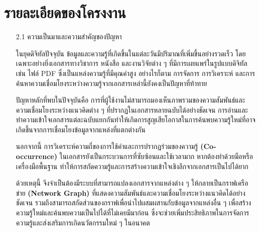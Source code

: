 \documentclass[12pt,a4paper]{article}
\newcommand{\textlight}[1]{{\thailightfont #1}}
\begin{document}
\section{รายละเอียดของโครงงาน}
\begin{enumerate}[leftmargin=2cm]
\small
    \item[2.1] ความเป็นมาและความสำคัญของปัญหา
    \vspace{0.35cm}
    \\
    \textlight{
        \hspace{1cm}ในยุคดิจิทัลปัจจุบัน ข้อมูลและความรู้ที่เกิดขึ้นในแต่ละวันมีปริมาณที่เพิ่มขึ้นอย่างรวดเร็ว โดยเฉพาะอย่างยิ่งเอกสารทางวิชาการ หนังสือ และงานวิจัยต่าง ๆ ที่มีการเผยแพร่ในรูปแบบดิจิทัล เช่น ไฟล์ PDF ซึ่งเป็นแหล่งความรู้ที่มีคุณค่าสูง อย่างไรก็ตาม การจัดการ การวิเคราะห์ และการค้นหาความเชื่อมโยงระหว่างความรู้จากเอกสารเหล่านี้ยังคงเป็นปัญหาที่ท้าทาย

        \hspace{1cm}ปัญหาหลักที่พบในปัจจุบันคือ การที่ผู้ใช้งานไม่สามารถมองเห็นภาพรวมของความสัมพันธ์และความเชื่อมโยงระหว่างแนวคิดต่าง ๆ ที่ปรากฏในเอกสารหลายฉบับได้อย่างชัดเจน การอ่านและทำความเข้าใจเอกสารแต่ละฉบับแยกกันทำให้เกิดการสูญเสียโอกาสในการค้นพบความรู้ใหม่ที่อาจเกิดขึ้นจากการเชื่อมโยงข้อมูลจากแหล่งที่แตกต่างกัน

        \hspace{1cm}นอกจากนี้ การวิเคราะห์ความถี่ของการใช้คำและการปรากฏร่วมของความรู้ \textbf{(Co-occurrence)} ในเอกสารยังเป็นกระบวนการที่ซับซ้อนและใช้เวลามาก หากต้องทำด้วยมือหรือเครื่องมือพื้นฐาน ทำให้การสกัดความรู้และการสร้างความเข้าใจเชิงลึกจากเอกสารเป็นไปได้ยาก

        \hspace{1cm}ด้วยเหตุนี้ จึงจำเป็นต้องมีระบบที่สามารถแปลงเอกสารจากแหล่งต่าง ๆ ให้กลายเป็นกราฟเครือข่าย \textbf{(Network Graph)} ที่แสดงความสัมพันธ์และความเชื่อมโยงระหว่างแนวคิดได้อย่างชัดเจน รวมถึงสามารถสกัดส่วนของกราฟเพื่อนำไปผสมผสานกับข้อมูลจากแหล่งอื่น ๆ เพื่อสร้างความรู้ใหม่และค้นพบความเป็นไปได้ที่ไม่เคยมีมาก่อน ซึ่งจะช่วยเพิ่มประสิทธิภาพในการจัดการความรู้และส่งเสริมการเกิดนวัตกรรมใหม่ ๆ ในอนาคต
    }


\end{enumerate}
\end{document}
